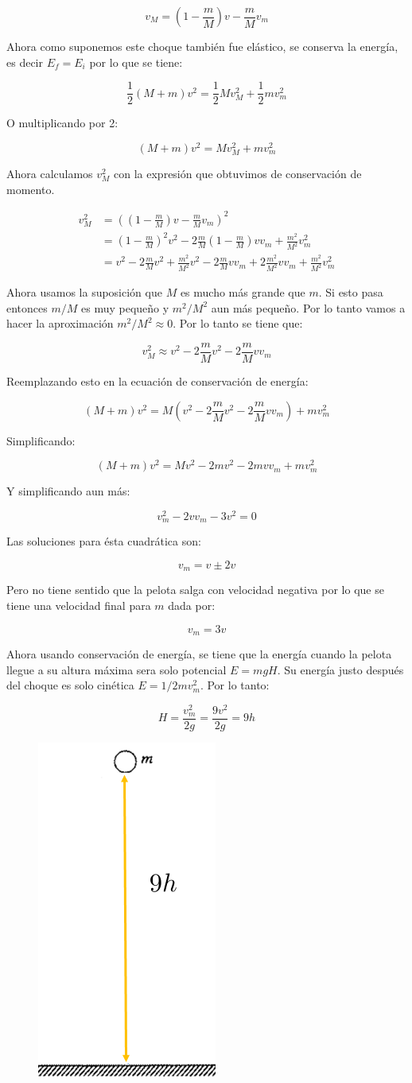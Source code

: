 \documentclass[a4paper,11pt]{article}
\theoremstyle{mytheor}
\begin{document}
$$  v_M =  \left(1-\frac{m}{M}\right)v -  \frac{m}{M} v_m $$


Ahora como suponemos este choque también fue elástico, se conserva la energía, es decir $E_f = E_i$ por lo que se tiene:

$$ \frac{1}{2} (M+m) v^2 = \frac{1}{2} M v_M^2 + \frac{1}{2} m v_m^2 $$

O multiplicando por 2:

$$  (M+m) v^2 =  M v_M^2 +  m v_m^2 $$


Ahora calculamos $v_M^2$ con la expresión que obtuvimos de conservación de momento.


\begin{align*}
v_M^2 & = \left( \left(1-\frac{m}{M}\right)v -  \frac{m}{M} v_m \right)^2 \\
& =    \left(1-\frac{m}{M}\right)^2v^2 -2\frac{m}{M} \left(1-\frac{m}{M}\right) v v_m + \frac{m^2}{M^2} v_m^2\\
& = v^2 - 2\frac{m}{M} v^2 + \frac{m^2}{M^2}v^2 - 2\frac{m}{M} v v_m + 2\frac{m^2}{M^2} v v_m  + \frac{m^2}{M^2} v_m^2
\end{align*}

Ahora usamos la suposición que $M$ es mucho más grande que $m$. Si esto pasa entonces $m/M$ es muy pequeño y $m^2/M^2$ aun más pequeño. Por lo tanto vamos a hacer la aproximación $m^2/M^2 \approx 0$. Por lo tanto se tiene que:


$$ v_M^2 \approx v^2 -  2\frac{m}{M} v^2 - 2\frac{m}{M} v v_m $$

Reemplazando esto en la ecuación de conservación de energía:



$$  (M+m) v^2 =  M  \left(v^2 -  2\frac{m}{M} v^2 - 2\frac{m}{M} v v_m\right) +  m v_m^2 $$

Simplificando:

$$  (M+m) v^2 =  M  v^2 -  2m v^2 - 2m v v_m +  m v_m^2 $$

Y simplificando aun más:


$$ v_m^2 - 2 v v_m  - 3v^2 = 0$$


Las soluciones para ésta cuadrática son:


$$ v_m = {v \pm 2 v} $$


Pero no tiene sentido que la pelota salga con velocidad negativa por lo que se tiene una velocidad final para $m$ dada por:


$$ v_m = 3v$$

Ahora usando conservación de energía, se tiene que la energía cuando la pelota llegue a su altura máxima sera solo potencial $E = mg H$. Su energía justo después del choque es solo cinética $E = 1/2 m v_m^2$. Por lo tanto:

$$ H = \frac{v^2_m}{2g} = \frac{9 v^2}{2g} = 9h$$


\begin{figure}[h]
	\includegraphics[width=.23\linewidth]{4}
	\label{fcN4}
\end{figure}
\end{document}
